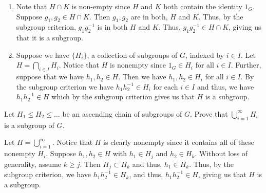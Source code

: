 \documentclass[12 pt, letterpaper]{hmcpset}
\begin{document}
\begin{solution}
	\begin{enumerate}
		\item Note that $H \cap K$ is non-empty since $H$ and $K$ both contain the identity $1_G$. Suppose $g_1, g_2 \in H \cap K$. Then $g_1, g_2$ are in both, $H$ and $K$. Thus, by the subgroup criterion, $g_1 g_2^{-1}$ is in both $H$ and $K$. Thus, $g_1 g_2^{-1} \in H \cap K$, giving us that it is a subgroup.
		\item Suppose we have $\{ H_i \}$, a collection of subgroups of $G$, indexed by $i \in I$. Let $H = \bigcap_{i \in I} H_i$. Notice that $H$ is nonempty since $1_G \in H_i$ for all $i \in I$. Further, suppose that we have $h_1, h_2 \in H$. Then we have $h_1, h_2 \in H_i$ for all $i \in I$. By the subgroup criterion we have $h_1 h_2^{-1} \in H_i$ for each $i \in I$ and thus, we have $h_1 h_2^{-1} \in H$ which by the subgroup criterion gives us that $H$ is a subgroup.
	\end{enumerate}
\end{solution}

\pagebreak

\begin{problem}
	Let $H_1 \le H_2 \le \dots$ be an ascending chain of subgroups of $G$. Prove that $\bigcup^\infty_{i = 1} H_i$ is a subgroup of $G$.
\end{problem}

\begin{solution}
	Let $H = \bigcup_{i = 1}^\infty$. Notice that $H$ is clearly nonempty since it contains all of these nonempty $H_i$. Suppose $h_1, h_2 \in H$ with $h_1 \in H_j$ and $h_2 \in H_k$. Without loss of generality, assume $k \ge j$. Then $H_j \subset H_k$ and thus, $h_1 \in H_k$. Thus, by the subgroup criterion, we have $h_1 h_2^{-1} \in H_k$, and thus, $h_1 h_2^{-1} \in H$, giving us that $H$ is a subgroup.
\end{solution}
\end{document}

